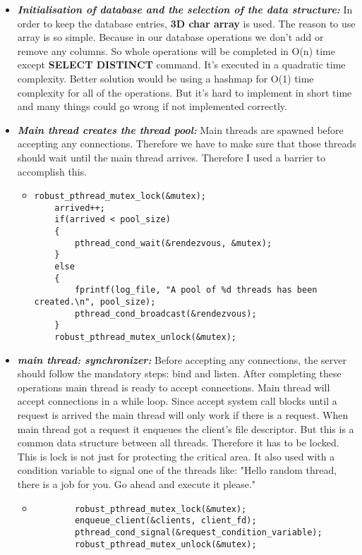 \documentclass{article}
\begin{document}
\begin{itemize}
\item \textbf{\textit{Initialisation of database and the selection of the data structure:}}
In order to keep the database entries, \textbf{3D char array} is used. The reason to use array is so simple. Because in our database operations we don't add or remove any columns. So whole operations will be completed in O(n) time except \textbf{SELECT DISTINCT} command. It's executed in a quadratic time complexity. Better solution would be using a hashmap for O(1) time complexity for all of the operations. But it's hard to implement in short time and many things could go wrong if not implemented correctly.

\item \textbf{\textit{Main thread creates the thread pool:}} Main threads are spawned before accepting any connections. Therefore we have to make sure that those threads should wait until the main thread arrives. Therefore I used a barrier to accomplish this.
\begin{itemize}
  \item
    \begin{lstlisting}
robust_pthread_mutex_lock(&mutex);
    arrived++;
    if(arrived < pool_size)
    {
        pthread_cond_wait(&rendezvous, &mutex);
    }
    else
    {
        fprintf(log_file, "A pool of %d threads has been created.\n", pool_size);
        pthread_cond_broadcast(&rendezvous);
    }
    robust_pthread_mutex_unlock(&mutex);
    \end{lstlisting}
\end{itemize}
\item \textbf{\textit{main thread: synchronizer:}}
Before accepting any connections, the server should follow the mandatory steps: bind and listen. After completing these operations main thread is ready to accept connections.
\newline \quad Main thread will accept connections in a while loop. Since accept system call blocks until a request is arrived the main thread will only work if there is a request. When main thread got a request it enqueues the client's file descriptor. But this is a common data structure between all threads. Therefore it has to be locked. This is lock is not just for protecting the critical area. It also used with a condition variable to signal one of the threads like: "Hello random thread, there is a job for you. Go ahead and execute it please."
\newpage
\begin{itemize}
  \item
    \begin{lstlisting}
        robust_pthread_mutex_lock(&mutex);
        enqueue_client(&clients, client_fd);
        pthread_cond_signal(&request_condition_variable);
        robust_pthread_mutex_unlock(&mutex);
    \end{lstlisting}
\end{itemize}


\end{itemize}
\end{document}
